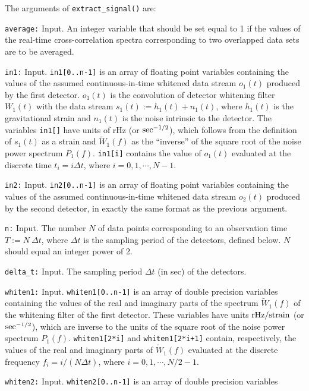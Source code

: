 The arguments of {\tt extract\_signal()} are:
\begin{description}
%
\item{\tt average:} Input.
An integer variable that should be set equal to 1 if the values 
of the real-time cross-correlation spectra corresponding to two 
overlapped data sets are to be averaged.
%
\item{\tt in1:} Input.  
{\tt in1[0..n-1]} is an array of floating point variables containing
the values of the assumed continuous-in-time 
whitened data stream $o_1(t)$ produced by the first detector.
$o_1(t)$ is the convolution of detector whitening filter $W_1(t)$
with the data stream $s_1(t):=h_1(t)+n_1(t)$, where $h_1(t)$ is the 
gravitational strain and $n_1(t)$ is the noise intrinsic to the detector.
The variables {\tt in1[]} have units of rHz (or ${\rm sec}^{-1/2}$),
which follows from the definition of $s_1(t)$ as a strain and
$\tilde W_1(f)$ as the ``inverse'' of the square root 
of the noise power spectrum $P_1(f)$.
{\tt in1[i]} contains the value of $o_1(t)$ evaluated at the discrete 
time $t_i=i\Delta t$, where $i=0,1,\cdots,N-1$.
%
\item{\tt in2:} Input.  
{\tt in2[0..n-1]} is an array of floating point variables containing
the values of the assumed continuous-in-time 
whitened data stream $o_2(t)$ produced by the second detector,
in exactly the same format as the previous argument.
%
\item{\tt n:} Input. 
The number $N$ of data points corresponding to an observation
time $T:=N\ \Delta t$, where
$\Delta t$ is the sampling period of the detectors, defined below.
$N$ should equal an integer power of 2.
%
\item{\tt delta\_t:} Input.  
The sampling period $\Delta t$ (in sec) of the detectors. 
%
\item{\tt whiten1:} Input.
{\tt whiten1[0..n-1]} is an array of double precision variables 
containing the values of the real and imaginary parts of the spectrum 
$\tilde W_1(f)$ of the whitening filter of the first detector.
These variables have units ${\rm rHz}/{\rm strain}$ 
(or ${\rm sec}^{-1/2}$), which are inverse to the units of the square 
root of the noise power spectrum $P_1(f)$.
{\tt whiten1[2*i]} and {\tt whiten1[2*i+1]} contain, respectively, 
the values of the real and imaginary parts of $\tilde W_1(f)$
evaluated at the discrete frequency $f_i=i/(N\Delta t)$, where 
$i=0,1,\cdots,N/2-1$.
%
\item{\tt whiten2:} Input. 
{\tt whiten2[0..n-1]} is an array of double precision variables 

\end{description}
